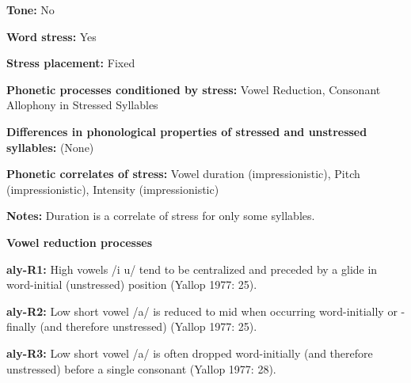 \begin{styleBody}
\textbf{Tone:} No
\end{styleBody}

\begin{styleBody}
\textbf{Word stress:} Yes
\end{styleBody}

\begin{styleBody}
\textbf{Stress placement:} Fixed
\end{styleBody}

\begin{styleBody}
\textbf{Phonetic processes conditioned by stress:} Vowel Reduction, Consonant Allophony in Stressed Syllables
\end{styleBody}

\begin{styleBody}
\textbf{Differences in phonological properties of stressed and unstressed syllables:} (None)
\end{styleBody}

\begin{styleBody}
\textbf{Phonetic correlates of stress: }Vowel duration (impressionistic), Pitch (impressionistic), Intensity (impressionistic)
\end{styleBody}

\begin{styleBody}
\textbf{Notes: }Duration is a correlate of stress for only some syllables.
\end{styleBody}

\begin{styleBody}
\textbf{Vowel reduction processes}
\end{styleBody}

\begin{styleBody}
\textbf{aly-R1:} High vowels /i u/ tend to be centralized and preceded by a glide in word-initial (unstressed) position (Yallop 1977: 25).
\end{styleBody}

\begin{styleBody}
\textbf{aly-R2:} Low short vowel /a/ is reduced to mid when occurring word-initially or -finally (and therefore unstressed) (Yallop 1977: 25).
\end{styleBody}

\begin{styleBody}
\textbf{aly-R3:} Low short vowel /a/ is often dropped word-initially (and therefore unstressed) before a single consonant (Yallop 1977: 28).
\end{styleBody}

